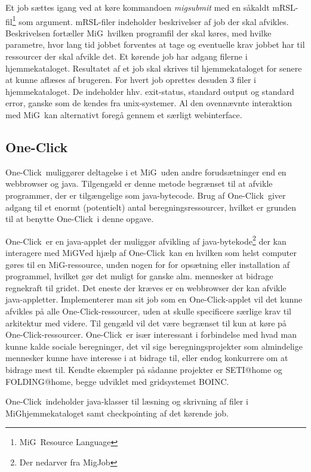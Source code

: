 \documentclass[pdf,draft,a4paper,11pt]{article}
\newcommand{\mig}{MiG}
\newcommand{\oc}{One-Click}
\begin{document}
Et job sættes igang ved at køre kommandoen \emph{migsubmit} med en såkaldt mRSL-fil\footnote{\mig\ Resource Language} som argument. mRSL-filer indeholder beskrivelser af job der skal afvikles. Beskrivelsen fortæller \mig\ hvilken programfil der skal køres, med hvilke parametre, hvor lang tid jobbet forventes at tage og eventuelle krav jobbet har til ressourcer der skal afvikle det. Et kørende job har adgang filerne i  hjemmekataloget. Resultatet af et job skal skrives til hjemmekataloget for senere at kunne aflæses af brugeren. For hvert job oprettes desuden 3 filer i hjemmekataloget. De indeholder hhv. exit-status, standard output og standard error, ganske som de kendes fra unix-systemer. Al den ovennævnte interaktion med \mig\ kan alternativt foregå gennem et særligt webinterface. 

\subsection{\oc}\label{applet}
\oc\ muliggører deltagelse i et \mig\ uden andre forudsætninger end en webbrowser og java. Tilgengæld er denne metode begrænset til at afvikle programmer, der er tilgængelige som java-bytecode. Brug af \oc\ giver adgang til et enormt (potentielt) antal beregningsressourcer, hvilket er grunden til at benytte \oc\ i denne opgave.

\oc\ er en java-applet der muliggør afvikling af java-bytekode\footnote{Der nedarver fra MigJob} der kan interagere med \mig\. Ved hjælp af \oc\ kan en hvilken som helst computer gøres til en \mig-ressource, unden nogen for for opsætning eller installation af programmel, hvilket gør det muligt for ganske alm. mennesker at bidrage regnekraft til gridet. Det eneste der kræves er en webbrowser der kan afvikle java-appletter. Implementerer man sit job som en \oc-applet vil det kunne afvikles på alle \oc-ressourcer, uden at skulle specificere særlige krav til arkitektur med videre. Til gengæld vil det være begrænset til kun at køre på \oc-ressourcer. 
\oc\ er især interessant i forbindelse med hvad man kunne kalde sociale beregninger, det vil sige beregningsprojekter som almindelige mennesker kunne have interesse i at bidrage til, eller endog konkurrere om at bidrage mest til. Kendte eksempler på sådanne projekter er SETI@home og FOLDING@home, begge udviklet med gridsystemet BOINC\cite{boinc}. 

\oc\ indeholder java-klasser til læsning og skrivning af filer i \mig\-hjemmekataloget samt checkpointing af det kørende job. 
\end{document}
